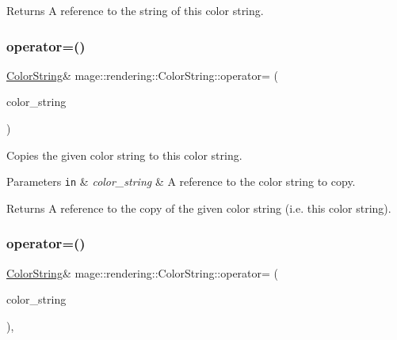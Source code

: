 \begin{DoxyReturn}{Returns}
A reference to the string of this color string. 
\end{DoxyReturn}
\mbox{\label{classmage_1_1rendering_1_1_color_string_ab42304d36628f21263a4d545831b3829}} 
\subsubsection{\texorpdfstring{operator=()}{operator=()}\hspace{0.1cm}{\footnotesize\ttfamily [1/2]}}
{\footnotesize\ttfamily \mbox{\hyperlink{classmage_1_1rendering_1_1_color_string}{Color\+String}}\& mage\+::rendering\+::\+Color\+String\+::operator= (\begin{DoxyParamCaption}\item[{const \mbox{\hyperlink{classmage_1_1rendering_1_1_color_string}{Color\+String}} \&}]{color\+\_\+string }\end{DoxyParamCaption})\hspace{0.3cm}{\ttfamily [default]}}

Copies the given color string to this color string.


\begin{DoxyParams}[1]{Parameters}
\mbox{\tt in}  & {\em color\+\_\+string} & A reference to the color string to copy. \\
\hline
\end{DoxyParams}
\begin{DoxyReturn}{Returns}
A reference to the copy of the given color string (i.\+e. this color string). 
\end{DoxyReturn}
\mbox{\label{classmage_1_1rendering_1_1_color_string_aa70b60e0c8528306e7473ee0b5bfbe03}} 
\subsubsection{\texorpdfstring{operator=()}{operator=()}\hspace{0.1cm}{\footnotesize\ttfamily [2/2]}}
{\footnotesize\ttfamily \mbox{\hyperlink{classmage_1_1rendering_1_1_color_string}{Color\+String}}\& mage\+::rendering\+::\+Color\+String\+::operator= (\begin{DoxyParamCaption}\item[{\mbox{\hyperlink{classmage_1_1rendering_1_1_color_string}{Color\+String}} \&\&}]{color\+\_\+string }\end{DoxyParamCaption})\hspace{0.3cm}{\ttfamily [default]}, {\ttfamily [noexcept]}}

